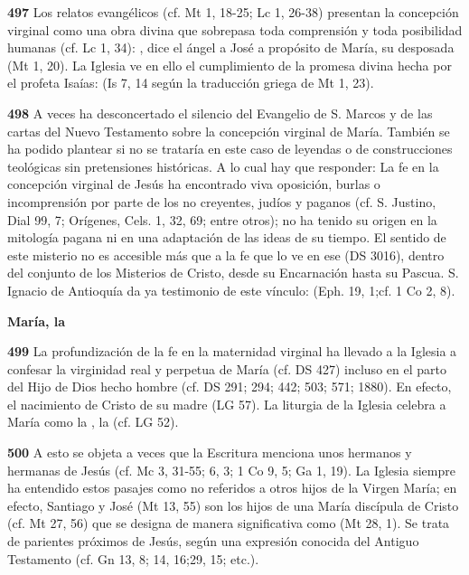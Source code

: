 \textbf{497} Los relatos evangélicos (cf. Mt 1, 18-25; Lc 1, 26-38) presentan la concepción virginal como una obra divina que sobrepasa toda comprensión y toda posibilidad humanas (cf. Lc 1, 34): , dice el ángel a José a propósito de María, su desposada (Mt 1, 20). La Iglesia ve en ello el cumplimiento de la promesa divina hecha por el profeta Isaías:  (Is 7, 14 según la traducción griega de Mt 1, 23).

\textbf{498} A veces ha desconcertado el silencio del Evangelio de S. Marcos y de las cartas del Nuevo Testamento sobre la concepción virginal de María. También se ha podido plantear si no se trataría en este caso de leyendas o de construcciones teológicas sin pretensiones históricas. A lo cual hay que responder: La fe en la concepción virginal de Jesús ha encontrado viva oposición, burlas o incomprensión por parte de los no creyentes, judíos y paganos (cf. S. Justino, Dial 99, 7; Orígenes, Cels. 1, 32, 69; entre otros); no ha tenido su origen en la mitología pagana ni en una adaptación de las ideas de su tiempo. El sentido de este misterio no es accesible más que a la fe que lo ve en ese  (DS 3016), dentro del conjunto de los Misterios de Cristo, desde su Encarnación hasta su Pascua. S. Ignacio de Antioquía da ya testimonio de este vínculo:  (Eph. 19, 1;cf. 1 Co 2, 8).\textbf{\\ }

\textbf{María, la }

\textbf{499} La profundización de la fe en la maternidad virginal ha llevado a la Iglesia a confesar la virginidad real y perpetua de María (cf. DS 427) incluso en el parto del Hijo de Dios hecho hombre (cf. DS 291; 294; 442; 503; 571; 1880). En efecto, el nacimiento de Cristo  de su madre (LG 57). La liturgia de la Iglesia celebra a María como la , la  (cf. LG 52).

\textbf{500} A esto se objeta a veces que la Escritura menciona unos hermanos y hermanas de Jesús (cf. Mc 3, 31-55; 6, 3; 1 Co 9, 5; Ga 1, 19). La Iglesia siempre ha entendido estos pasajes como no referidos a otros hijos de la Virgen María; en efecto, Santiago y José  (Mt 13, 55) son los hijos de una María discípula de Cristo (cf. Mt 27, 56) que se designa de manera significativa como  (Mt 28, 1). Se trata de parientes próximos de Jesús, según una expresión conocida del Antiguo Testamento (cf. Gn 13, 8; 14, 16;29, 15; etc.).

